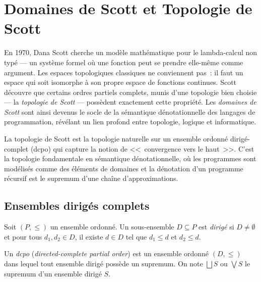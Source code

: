 \chapter{Domaines de Scott et Topologie de Scott}
\label{ch:scott}

En 1970, Dana Scott cherche un mod\`ele math\'ematique pour le lambda-calcul non typ\'e --- un syst\`eme formel o\`u une fonction peut se prendre elle-m\^eme comme argument. Les espaces topologiques classiques ne conviennent pas~: il faut un espace qui soit isomorphe \`a son propre espace de fonctions continues. Scott d\'ecouvre que certains ordres partiels complets, munis d'une topologie bien choisie --- la \emph{topologie de Scott} --- poss\`edent exactement cette propri\'et\'e. Les \emph{domaines de Scott} sont ainsi devenus le socle de la s\'emantique d\'enotationnelle des langages de programmation, r\'ev\'elant un lien profond entre topologie, logique et informatique.

\begin{intuition}
La topologie de Scott est la topologie naturelle sur un ensemble ordonn\'e dirig\'e-complet
(dcpo) qui capture la notion de <<~convergence vers le haut~>>. C'est la topologie
fondamentale en s\'emantique d\'enotationnelle, o\`u les programmes sont mod\'elis\'es comme
des \'el\'ements de domaines et la d\'enotation d'un programme r\'ecursif est le supremum
d'une cha\^ine d'approximations.
\end{intuition}

\section{Ensembles dirig\'es complets}

\begin{definition}
Soit $(P,\leq)$ un ensemble ordonn\'e. Un sous-ensemble $D \subseteq P$ est \emph{dirig\'e}
si $D \neq \emptyset$ et pour tous $d_1, d_2 \in D$, il existe $d \in D$ tel que
$d_1 \leq d$ et $d_2 \leq d$.
\end{definition}

\begin{definition}[Dcpo]
Un \emph{dcpo} (\emph{directed-complete partial order}) est un ensemble ordonn\'e $(D,\leq)$
dans lequel tout ensemble dirig\'e poss\`ede un supremum. On note $\bigsqcup S$ ou
$\bigvee S$ le supremum d'un ensemble dirig\'e $S$.
\end{definition}

